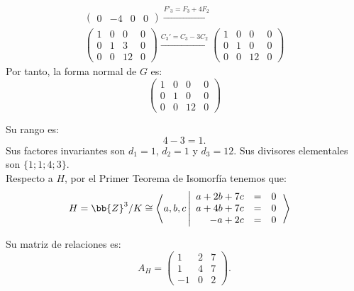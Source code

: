 \begin{ejercicio}
\begin{enumerate}
\begin{multline*}
\begin{pmatrix}
                0 & -4 & 0 & 0
            \end{pmatrix}
            \xrightarrow{F'_3=F_3+4F_2}\\
            \begin{pmatrix}
                1 & 0 & 0 & 0 \\
                0 & 1 & 3 & 0 \\
                0 & 0 & 12 & 0
            \end{pmatrix}
            \xrightarrow{C_3'=C_3-3C_2}
            \begin{pmatrix}
                1 & 0 & 0 & 0 \\
                0 & 1 & 0 & 0 \\
                0 & 0 & 12 & 0
            \end{pmatrix}
        \end{multline*}
        Por tanto, la forma normal de $G$ es:
        \begin{equation*}
            \begin{pmatrix}
                1 & 0 & 0 & 0 \\
                0 & 1 & 0 & 0 \\
                0 & 0 & 12 & 0
            \end{pmatrix}
        \end{equation*}

        Su rango es:
        \begin{equation*}
            4-3= 1.
        \end{equation*}
        Sus factores invariantes son $d_1=1$, $d_2=1$ y $d_3=12$.
        Sus divisores elementales son $\{1; 1; 4; 3\}$.\\

        Respecto a $H$, por el Primer Teorema de Isomorfía tenemos que:
        \begin{align*}
            H= \bb{Z}^3/K &\cong \left\langle a,b,c \left|
                \begin{array}{rcl}
                    a + 2b + 7c &=& 0 \\
                    a + 4b + 7c &=& 0 \\
                    -a + 2c &=& 0
                \end{array}
            \right.\right\rangle
        \end{align*}

        Su matriz de relaciones es:
        \begin{equation*}
            A_H = \begin{pmatrix}
                1 & 2 & 7 \\
                1 & 4 & 7 \\
                -1 & 0 & 2
            \end{pmatrix}.
        \end{equation*}


\end{enumerate}
\end{ejercicio}
